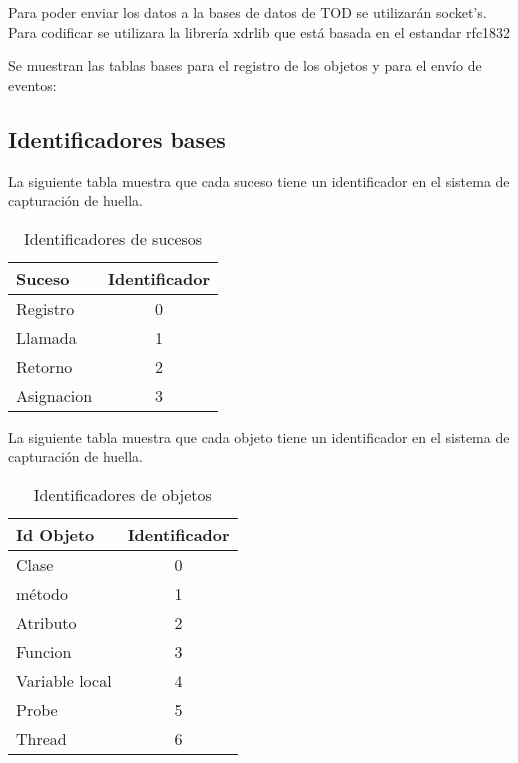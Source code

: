 \documentclass[10pt,a4paper]{article}
\begin{document}
Para poder enviar los datos a la bases de datos de TOD se utilizarán socket's.  Para codificar se utilizara la librería xdrlib que está basada en el estandar rfc1832 \cite{rfc1832}

Se muestran las tablas bases para el registro de los objetos y para el envío de eventos:

\subsection{Identificadores bases}

La siguiente tabla muestra que cada suceso tiene un identificador en el sistema de capturación de huella.
\begin{table}[h]
\begin{center}
\begin{tabular}{|l | c |}
\hline
Suceso & Identificador\\
\hline
Registro & 0\\
\hline
Llamada & 1\\
\hline
Retorno & 2\\
\hline
Asignacion & 3\\
\hline
\end{tabular}
\caption{Identificadores de sucesos} 
\end{center}
\end{table}

La siguiente tabla muestra que cada objeto tiene un identificador en el sistema de capturación de huella.
\begin{table}[h]
\begin{center}
\begin{tabular}{|l | c |}
\hline
Id Objeto & Identificador\\
\hline
Clase & 0\\
\hline
método & 1\\
\hline
Atributo & 2\\
\hline
Funcion & 3\\
\hline
Variable local & 4\\
\hline
Probe & 5\\
\hline
Thread & 6\\
\hline
\end{tabular}
\caption{Identificadores de objetos} 
\end{center}
\end{table}
\\
\pagebreak
\end{document}
